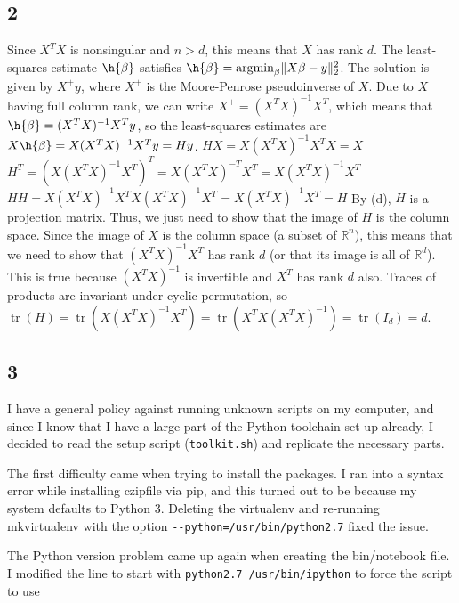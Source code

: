 \documentclass{article}
\DeclareMathOperator{\tr}{tr}
\newcommand{\rn}{\mathbb{R}}
\begin{document}
\subsection*{2}
Since $X^TX$ is nonsingular and $n>d$, this means that $X$ has rank $d$. The least-squares estimate $\h{\beta}$ satisfies $\h{\beta}=\text{argmin}_\beta\|X\beta-y\|_2^2$. The solution is given by $X^+y$, where $X^+$ is the Moore-Penrose pseudoinverse of $X$. Due to $X$ having full column rank, we can write $X^+=(X^TX)^{-1}X^T$, which means that $\h{\beta}=(X^TX)^{-1}X^Ty$, so the least-squares estimates are $X\h{\beta}=X(X^TX)^{-1}X^Ty=Hy$.
$HX=X(X^TX)^{-1}X^TX=X$
$H^T=(X(X^TX)^{-1}X^T)^T=X(X^TX)^{-T}X^T=X(X^TX)^{-1}X^T$
$HH=X(X^TX)^{-1}X^TX(X^TX)^{-1}X^T=X(X^TX)^{-1}X^T=H$
By (d), $H$ is a projection matrix. Thus, we just need to show that the image of $H$ is the column space. Since the image of $X$ is the column space (a subset of $\rn^n$), this means that we need to show that $(X^TX)^{-1}X^T$ has rank $d$ (or that its image is all of $\rn^d$). This is true because $(X^TX)^{-1}$ is invertible and $X^T$ has rank $d$ also. 
Traces of products are invariant under cyclic permutation, so $\tr(H)=\tr(X(X^TX)^{-1}X^T)=\tr(X^TX(X^TX)^{-1})=\tr(I_d)=d$.
\subsection*{3}
I have a general policy against running unknown scripts on my computer, and since I know that I have a large part of the Python toolchain set up already, I decided to read the setup script (\verb|toolkit.sh|) and replicate the necessary parts. 

The first difficulty came when trying to install the packages. I ran into a syntax error while installing czipfile via pip, and this turned out to be because my system defaults to Python 3. Deleting the virtualenv and re-running mkvirtualenv with the option \verb|--python=/usr/bin/python2.7| fixed the issue.

The Python version problem came up again when creating the bin/notebook file. I modified the line to start with \verb|python2.7 /usr/bin/ipython| to force the script to use 
\end{document}

